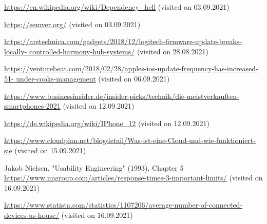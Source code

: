 \begin{thebibliography}{9}
\url{https://en.wikipedia.org/wiki/Dependency_hell} (visited on 03.09.2021)

\url{https://semver.org/} (visited on 03.09.2021)

\url{https://arstechnica.com/gadgets/2018/12/logitech-firmware-update-breaks-locally-
controlled-harmony-hub-systems/} (visited on 28.08.2021)


\url{https://venturebeat.com/2018/02/28/apples-ios-update-frequency-has-increased-51-
under-cooks-management} (visited on 06.09.2021)

\url{https://www.businessinsider.de/insider-picks/technik/die-meistverkauften-smartphones-2021} (visited on 12.09.2021)

\url{https://de.wikipedia.org/wiki/IPhone\_12} (visited on 12.09.2021)

\url{https://www.cloudplan.net/blogdetail/Was-ist-eine-Cloud-und-wie-funktioniert-sie} (visited on 15.09.2021)

Jakob Nielsen, "Usability Engineering" (1993), Chapter 5
\url{https://www.nngroup.com/articles/response-times-3-important-limits/} (visited on 16.09.2021)

\url{https://www.statista.com/statistics/1107206/average-number-of-connected-devices-us-house/} (visited on 16.09.2021)

\end{thebibliography}
